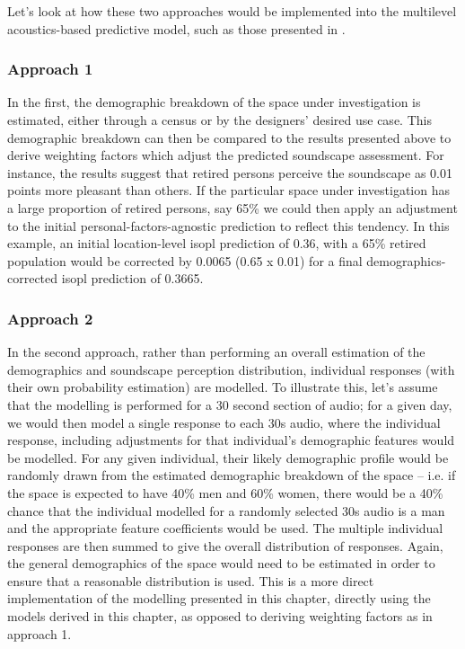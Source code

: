 Let's look at how these two approaches would be implemented into the multilevel acoustics-based predictive model, such as those presented in .

\subsubsection{Approach 1}
In the first, the demographic breakdown of the space under investigation is estimated, either through a census or by the designers' desired use case. This demographic breakdown can then be compared to the results presented above \citep{Erfanian2021Psychological} to derive weighting factors which adjust the predicted soundscape assessment. For instance, the results suggest that retired persons perceive the soundscape as 0.01 points more pleasant than others. If the particular space under investigation has a large proportion of retired persons, say 65\% we could then apply an adjustment to the initial personal-factors-agnostic prediction to reflect this tendency. In this example, an initial location-level \gls{isopl} prediction of 0.36, with a 65\% retired population would be corrected by 0.0065 (0.65 x 0.01) for a final demographics-corrected \gls{isopl} prediction of 0.3665.

\subsubsection{Approach 2}
In the second approach, rather than performing an overall estimation of the demographics and soundscape perception distribution, individual responses (with their own probability estimation) are modelled. To illustrate this, let's assume that the modelling is performed for a 30 second section of audio; for a given day, we would then model a single response to each 30s audio, where the individual response, including adjustments for that individual's demographic features would be modelled. For any given individual, their likely demographic profile would be randomly drawn from the estimated demographic breakdown of the space -- i.e. if the space is expected to have 40\% men and 60\% women, there would be a 40\% chance that the individual modelled for a randomly selected 30s audio is a man and the appropriate feature coefficients would be used. The multiple individual responses are then summed to give the overall distribution of responses. Again, the general demographics of the space would need to be estimated in order to ensure that a reasonable distribution is used. This is a more direct implementation of the modelling presented in this chapter, directly using the models derived in this chapter, as opposed to deriving weighting factors as in approach 1.

